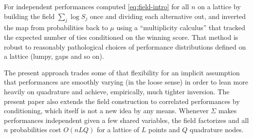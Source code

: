 \documentclass[11pt]{article}
\begin{document}
For independent performances \citet{cotton2021} computed \eqref{eq:field-intro} for
all $n$ on a lattice by building the field $\sum_j \log S_j$ once and dividing
each alternative out, and inverted the map from probabilities back to $\mu$ using a ``multiplicity calculus'' that tracked the expected number of ties conditioned on the winning score. That method is robust to reasonably pathological choices of performance distributions defined on a lattice (lumpy, gaps and so on).

The present approach trades some of that flexibility for an implicit assumption that performances are smoothly varying (in the loose sense) in order to lean more heavily on quadrature and achieve, empirically, much tighter inversion. The
present paper also extends the field construction to correlated performances by
conditioning, which itself is not a new idea by any means. Whenever $\Sigma$ makes performances independent given a few shared variables, the field factorizes and all $n$ probabilities cost $O(nLQ)$ for a lattice of $L$ points and $Q$ quadrature nodes.
\end{document}
